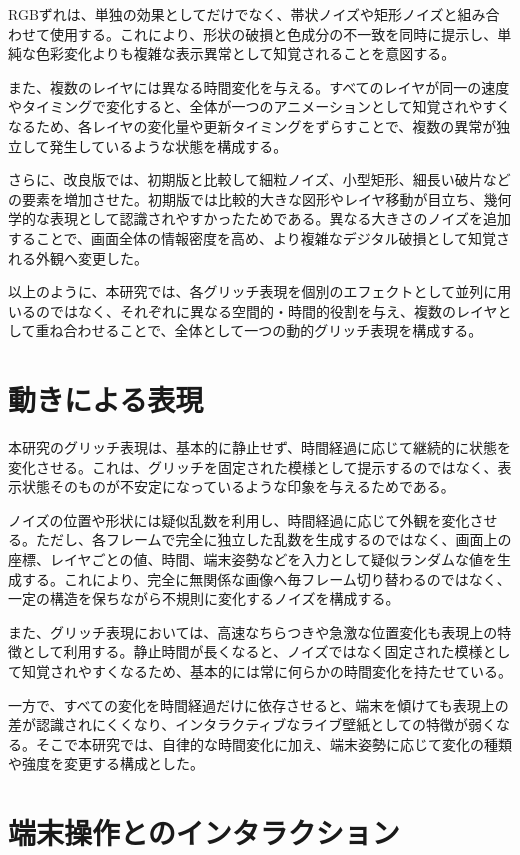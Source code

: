 RGBずれは、単独の効果としてだけでなく、帯状ノイズや矩形ノイズと組み合わせて使用する。これにより、形状の破損と色成分の不一致を同時に提示し、単純な色彩変化よりも複雑な表示異常として知覚されることを意図する。

また、複数のレイヤには異なる時間変化を与える。すべてのレイヤが同一の速度やタイミングで変化すると、全体が一つのアニメーションとして知覚されやすくなるため、各レイヤの変化量や更新タイミングをずらすことで、複数の異常が独立して発生しているような状態を構成する。

さらに、改良版では、初期版と比較して細粒ノイズ、小型矩形、細長い破片などの要素を増加させた。初期版では比較的大きな図形やレイヤ移動が目立ち、幾何学的な表現として認識されやすかったためである。異なる大きさのノイズを追加することで、画面全体の情報密度を高め、より複雑なデジタル破損として知覚される外観へ変更した。

以上のように、本研究では、各グリッチ表現を個別のエフェクトとして並列に用いるのではなく、それぞれに異なる空間的・時間的役割を与え、複数のレイヤとして重ね合わせることで、全体として一つの動的グリッチ表現を構成する。


\section{動きによる表現}

本研究のグリッチ表現は、基本的に静止せず、時間経過に応じて継続的に状態を変化させる。これは、グリッチを固定された模様として提示するのではなく、表示状態そのものが不安定になっているような印象を与えるためである。

ノイズの位置や形状には疑似乱数を利用し、時間経過に応じて外観を変化させる。ただし、各フレームで完全に独立した乱数を生成するのではなく、画面上の座標、レイヤごとの値、時間、端末姿勢などを入力として疑似ランダムな値を生成する。これにより、完全に無関係な画像へ毎フレーム切り替わるのではなく、一定の構造を保ちながら不規則に変化するノイズを構成する。

また、グリッチ表現においては、高速なちらつきや急激な位置変化も表現上の特徴として利用する。静止時間が長くなると、ノイズではなく固定された模様として知覚されやすくなるため、基本的には常に何らかの時間変化を持たせている。

一方で、すべての変化を時間経過だけに依存させると、端末を傾けても表現上の差が認識されにくくなり、インタラクティブなライブ壁紙としての特徴が弱くなる。そこで本研究では、自律的な時間変化に加え、端末姿勢に応じて変化の種類や強度を変更する構成とした。


\section{端末操作とのインタラクション}

